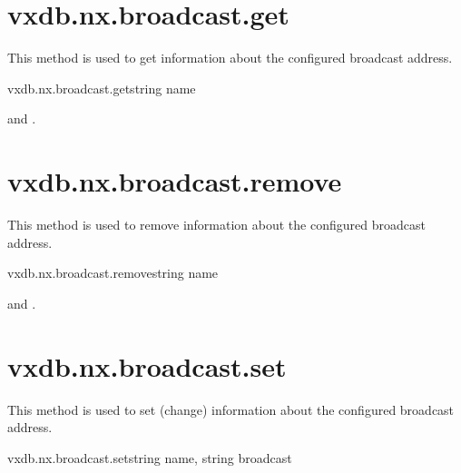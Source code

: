 \rpcreturnnil

\rpcnoerrors


\section{vxdb.nx.broadcast.get}

This method is used to get information about the configured broadcast address.

\begin{rpcsynopsis}{vxdb.nx.broadcast.get}{string name}
\end{rpcsynopsis}

\begin{rpcaccess}
 and \rpcownerchecks.
\end{rpcaccess}


\rpcnoerrors


\section{vxdb.nx.broadcast.remove}

This method is used to remove information about the configured broadcast
address.

\begin{rpcsynopsis}{vxdb.nx.broadcast.remove}{string name}
\end{rpcsynopsis}

\begin{rpcaccess}
 and \rpcownerchecks.
\end{rpcaccess}

\rpcreturnnil

\rpcnoerrors


\section{vxdb.nx.broadcast.set}

This method is used to set (change) information about the configured broadcast
address.

\begin{rpcsynopsis}{vxdb.nx.broadcast.set}{string name, string broadcast}
\end{rpcsynopsis}


